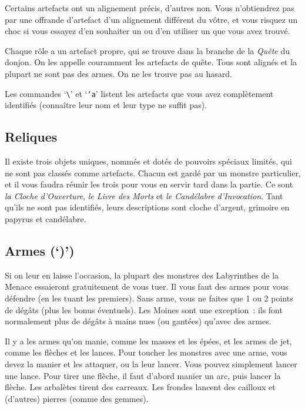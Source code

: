 \documentclass[titlepage]{article}
\begin{document}
Certains artefacts ont un alignement précis, d'autres non.
Vous n'obtiendrez pas par une offrande d'artefact d'un alignement différent
du vôtre, et vous risquez un choc si vous essayez d'en souhaiter un ou d'en
utiliser un que vous avez trouvé.


Chaque rôle a un artefact propre, qui se trouve dans la branche de la
\textit{Quête} du donjon.
On les appelle couramment les artefacts de quête.
Tous sont alignés et la plupart ne sont pas des armes.
On ne les trouve pas au hasard.


Les commandes `\texttt{\textbackslash{}}' et `\texttt{`a}' listent les artefacts
que vous avez complètement identifiés (connaître leur nom et leur type ne
suffit pas).

\subsection{Reliques}



Il existe trois objets uniques, nommés et dotés de pouvoirs spéciaux
limités, qui ne sont pas classés comme artefacts.
Chacun est gardé par un monstre particulier, et il vous faudra réunir les
trois pour vous en servir tard dans la partie.
Ce sont \textit{la Cloche d'Ouverture},
\textit{le Livre des Morts} et
\textit{le Candélabre d'Invocation}.
Tant qu'ils ne sont pas identifiés, leurs descriptions sont cloche
d'argent, grimoire en papyrus et candélabre.

\subsection{Armes (`)')}



Si on leur en laisse l'occasion, la plupart des monstres des Labyrinthes
de la Menace essaieront gratuitement de vous tuer.
Il vous faut des armes pour vous défendre (en les tuant les premiers).
Sans arme, vous ne faites que 1 ou 2 points de dégâts (plus les bonus
éventuels).
Les Moines sont une exception~: ils font normalement plus de dégâts à mains
nues (ou gantées) qu'avec des armes.


Il y a les armes qu'on manie, comme les masses et les épées, et les armes
de jet, comme les flèches et les lances.
Pour toucher les monstres avec une arme, vous devez la manier et les
attaquer, ou la leur lancer.
Vous pouvez simplement lancer une lance.
Pour tirer une flèche, il faut d'abord manier un arc, puis lancer la
flèche.
Les arbalètes tirent des carreaux.
Les frondes lancent des cailloux et (d'autres) pierres (comme des
gemmes).
\end{document}
